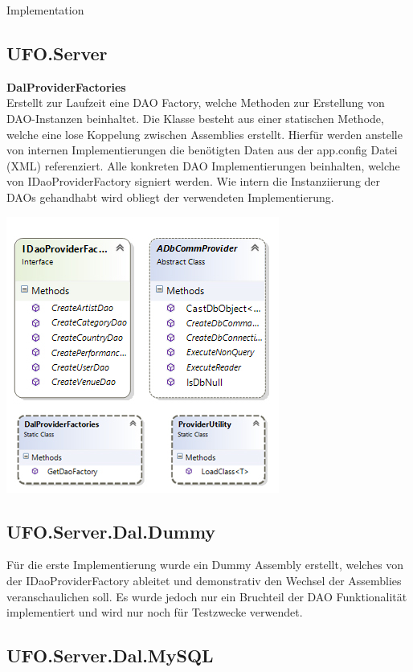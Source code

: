 \begin{section}{Implementation}

\subsection{UFO.Server}

\textbf{DalProviderFactories} \\
Erstellt zur Laufzeit eine DAO Factory, welche Methoden zur Erstellung von DAO-Instanzen beinhaltet. Die Klasse besteht aus einer statischen Methode, welche eine lose Koppelung zwischen Assemblies erstellt. Hierfür werden anstelle von internen Implementierungen die benötigten Daten aus der app.config Datei (XML) referenziert. Alle konkreten DAO Implementierungen beinhalten, welche von IDaoProviderFactory signiert werden. Wie intern die Instanziierung der DAOs gehandhabt wird obliegt der verwendeten Implementierung.

\includegraphics[angle=0, scale=0.45]{./img/DaoProviderFactory.jpg}
\FloatBarrier

\subsection{UFO.Server.Dal.Dummy}
Für die erste Implementierung wurde ein Dummy Assembly erstellt, welches von der IDaoProviderFactory ableitet und demonstrativ den Wechsel der Assemblies veranschaulichen soll. Es wurde jedoch nur ein Bruchteil der DAO Funktionalität implementiert und wird nur noch für Testzwecke verwendet.

\subsection{UFO.Server.Dal.MySQL}


\end{section}
